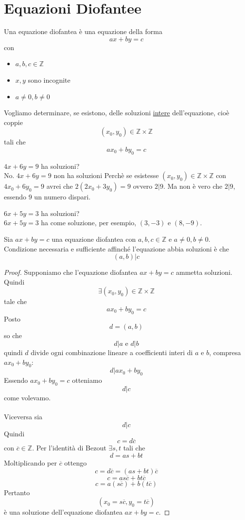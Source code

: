 \documentclass[a4paper,12pt, oneside]{book}
\begin{document}
\chapter{Equazioni Diofantee}
\begin{definizione}
	Una equazione diofantea è una equazione della forma $$ax+by=c$$ con
	\begin{itemize}
		\item $a,b,c \in \mathbb{Z}$
		\item $x,y$ sono incognite
		\item $a \not = 0, b \not = 0$
	\end{itemize}
	Vogliamo determinare, se esistono, delle soluzioni \underline{intere} dell'equazione, cioè coppie $$(x_0, y_0) \in \mathbb{Z} \times \mathbb{Z} $$ tali che $$ax_0+by_0=c$$
\end{definizione}
\begin{shaded}
	\begin{esempio}
		$4x+6y=9$ ha soluzioni?\\
		No. $4x+6y=9$ non ha soluzioni Perchè se esistesse $(x_0,y_0) \in \mathbb{Z} \times \mathbb{Z}$ con $4x_0+6y_0=9$ avrei che $2(2x_0+3y_0)=9$ ovvero $2|9$. Ma non è vero che $2|9$, essendo $9$ un numero dispari.
	\end{esempio}
	\begin{esempio}
		$6x+5y=3$ ha soluzioni?\\
		$6x+5y=3$ ha come soluzione, per esempio, $(3,-3)$ e $(8,-9)$.
	\end{esempio}
\end{shaded}
\begin{teorema}
	Sia $ax+by=c$ una equazione diofantea con $a,b,c \in \mathbb{Z}$ e $a\not=0,b\not=0$.\\
	Condizione necessaria e sufficiente affinché l'equazione abbia soluzioni è che $$(a,b)|c$$

	\begin{proof}
		Supponiamo che l'equazione diofantea $ax+by=c$ ammetta soluzioni. Quindi $$\exists (x_0,y_0) \in \mathbb{Z} \times \mathbb{Z}$$ tale che $$ax_0+by_0=c$$
		Posto $$d=(a,b)$$ so che $$d|a \mbox{ e } d|b$$ quindi $d$ divide ogni combinazione lineare a coefficienti interi di $a$ e $b$, compresa $ax_0+by_0$:
		$$d|ax_0+by_0$$
		Essendo $ax_0+by_0 = c$ otteniamo $$d|c$$ come volevamo.\\\\

		Viceversa sia $$d|c$$
		Quindi $$c=d\overline{c}$$ con $\overline{c} \in \mathbb{Z}$.
		Per l'identità di Bezout $\exists s,t$ tali che $$d=as+bt$$
		Moltiplicando per $\overline{c}$ ottengo
		$$c = d\overline{c} = (as+bt)\overline{c}$$
		$$c = as\overline{c}+bt\overline{c}$$
		$$c = a(s\overline{c})+b(t\overline{c})$$
		Pertanto $$(x_0 = s\overline{c}, y_0 = t\overline{c})$$ è una soluzione dell'equazione diofantea $ax+by=c$.
	\end{proof}
\end{teorema}
\end{document}
